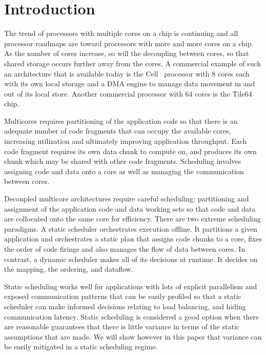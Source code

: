 \section{Introduction}

The trend of processors with multiple cores on a chip is continuing
and all processor roadmaps are toward processors with more and more
cores on a chip. As the number of cores increase, so will the
decoupling between cores, so that shared storage occurs further away
from the cores. A commercial example of such an architecture that is
available today is the Cell~\cite{cell} processor with 8 cores each with its own
local storage and a DMA engine to manage data movement in and out of
its local store. Another commercial processor with 64 cores is the
Tile64~\cite{tilera} chip.

Multicores requires partitioning of the application code so that there
is an adequate number of code fragments that can occupy the available
cores, increasing utilization and ultimately improving application throughput.
Each code fragment requires its own data chunk to compute on, and
produces its own chunk which may be shared with other code fragments.
Scheduling involves assigning code and data onto a core as well as
managing the communication between cores.

Decoupled multicore architectures require careful scheduling:
partitioning and assignment of the application code and data working
sets so that code and data are collocated onto the same core for
efficiency. There are two extreme scheduling paradigms. A
static scheduler orchestrates execution offline. It partitions a given application and
orchestrates a static plan that assigns code chunks to a core, fixes the
order of code firings and also manages the flow of data between
cores. In contrast, a dynamic scheduler makes all of its decisions at
runtime. It decides on the mapping, the ordering, and dataflow.

Static scheduling works well for applications with lots of explicit
parallelism and exposed communication patterns that can be easily
profiled so that a static scheduler can make informed decisions
relating to load balancing, and hiding communication latency.
Static scheduling is considered a good option when there are
reasonable guarantees that there is little variance in terms of the
static assumptions that are made. We will show however in this paper
that variance can be easily mitigated in a static scheduling regime.

